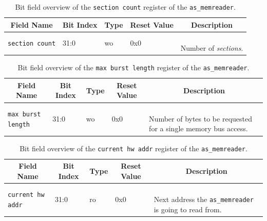 \begin{longtable}[ht]{|l|l|l|l|l|}
    \hline
    \multicolumn{1}{|c|}{\textbf{Field Name}} & \multicolumn{1}{c|}{\textbf{Bit Index}} & \multicolumn{1}{c|}{\textbf{Type}} & \multicolumn{1}{c|}{\textbf{Reset Value}} & \multicolumn{1}{c|}{\textbf{Description}}\\
    \hline
    
    \texttt{section count} & 31:0 & wo & 0x0 & \parbox{5cm}{\ \\
        Number of \textit{sections}.\vspace{0.3em}
    }\\
    \hline
    
    \caption{Bit field overview of the \texttt{section count} register of the \texttt{as\_memreader}.}
    \label{table:memreader-section_count-fields}
\end{longtable}


\begin{longtable}[ht]{|l|l|l|l|l|}
    \hline
    \multicolumn{1}{|c|}{\textbf{Field Name}} & \multicolumn{1}{c|}{\textbf{Bit Index}} & \multicolumn{1}{c|}{\textbf{Type}} & \multicolumn{1}{c|}{\textbf{Reset Value}} & \multicolumn{1}{c|}{\textbf{Description}}\\
    \hline
    
    \texttt{max burst length} & 31:0 & wo & 0x0 & \parbox{5cm}{\ \\
        Number of bytes to be requested for a single memory bus access.\vspace{0.3em}
    }\\
    \hline
    
    \caption{Bit field overview of the \texttt{max burst length} register of the \texttt{as\_memreader}.}
    \label{table:memreader-burst-fields}
\end{longtable}


\begin{longtable}[ht]{|l|l|l|l|l|}
    \hline
    \multicolumn{1}{|c|}{\textbf{Field Name}} & \multicolumn{1}{c|}{\textbf{Bit Index}} & \multicolumn{1}{c|}{\textbf{Type}} & \multicolumn{1}{c|}{\textbf{Reset Value}} & \multicolumn{1}{c|}{\textbf{Description}}\\
    \hline
    
    \texttt{current hw addr} & 31:0 & ro & 0x0 & \parbox{5cm}{\ \\
        Next address the \texttt{as\_memreader} is going to read from.\vspace{0.3em}
    }\\
    \hline
    
    \caption{Bit field overview of the \texttt{current hw addr} register of the \texttt{as\_memreader}.}
    \label{table:memreader-cur_hw-fields}
\end{longtable}


